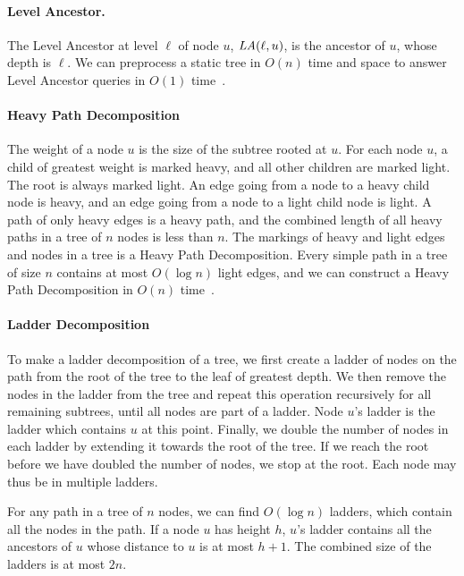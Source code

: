 \documentclass[a4]{article}
\begin{document}
\paragraph{Level Ancestor.}
The Level Ancestor at level $\ell$ of node $u$, $\textit{LA}(\ell,u)$, is the ancestor of $u$, whose depth is $\ell$. We can preprocess a static tree in $O(n)$ time and space to answer Level Ancestor queries in $O(1)$ time~\cite{level-ancestor}.

\paragraph{Heavy Path Decomposition}
The weight of a node $u$ is the size of the subtree rooted at $u$. For each node $u$, a child of greatest weight is marked heavy, and all other children are marked light. The root is always marked light. An edge going from a node to a heavy child node is heavy, and an edge going from a node to a light child node is light. A path of only heavy edges is a heavy path, and the combined length of all heavy paths in a tree of $n$ nodes is less than $n$. The markings of heavy and light edges and nodes in a tree is a Heavy Path Decomposition. Every simple path in a tree of size $n$ contains at most $O(\log n)$ light edges, and we can construct a Heavy Path Decomposition in $O(n)$ time~\cite{nca}.

\paragraph{Ladder Decomposition}
To make a ladder decomposition of a tree, we first create a ladder of nodes on the path from the root of the tree to the leaf of greatest depth. We then remove the nodes in the ladder from the tree and repeat this operation recursively for all remaining subtrees, until all nodes are part of a ladder. Node $u$'s ladder is the ladder which contains $u$ at this point. Finally, we double the number of nodes in each ladder by extending it towards the root of the tree. If we reach the root before we have doubled the number of nodes, we stop at the root. Each node may thus be in multiple ladders.

For any path in a tree of $n$ nodes, we can find $O(\log n)$ ladders, which contain all the nodes in the path. If a node $u$ has height $h$, $u$'s ladder contains all the ancestors of $u$ whose distance to $u$ is at most $h+1$. The combined size of the ladders is at most $2n$.~\cite{level-ancestor}

\end{document}
